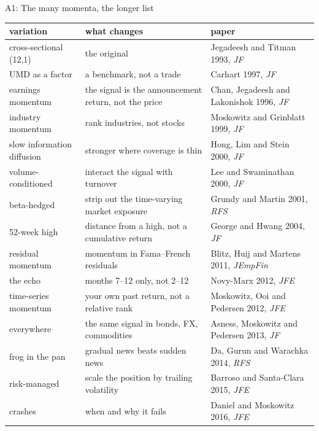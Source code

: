 \documentclass[aspectratio=169,10pt]{beamer}
\begin{document}
\begin{frame}[label=appendix_many]{A1: The many momenta, the longer list}
\scriptsize
\renewcommand{\arraystretch}{1.05}
\begin{center}
\begin{tabular}{P{2.8cm}P{4.8cm}P{4.9cm}}
\toprule
variation & what changes & paper \\
\midrule
cross-sectional (12,1) & the original & Jegadeesh and Titman 1993, \emph{JF} \\
UMD as a factor & a benchmark, not a trade & Carhart 1997, \emph{JF} \\
earnings momentum & the signal is the announcement return, not the price & Chan, Jegadeesh and Lakonishok 1996, \emph{JF} \\
industry momentum & rank industries, not stocks & Moskowitz and Grinblatt 1999, \emph{JF} \\
slow information diffusion & stronger where coverage is thin & Hong, Lim and Stein 2000, \emph{JF} \\
volume-conditioned & interact the signal with turnover & Lee and Swaminathan 2000, \emph{JF} \\
beta-hedged & strip out the time-varying market exposure & Grundy and Martin 2001, \emph{RFS} \\
52-week high & distance from a high, not a cumulative return & George and Hwang 2004, \emph{JF} \\
residual momentum & momentum in Fama--French residuals & Blitz, Huij and Martens 2011, \emph{JEmpFin} \\
the echo & months 7--12 only, not 2--12 & Novy-Marx 2012, \emph{JFE} \\
time-series momentum & your own past return, not a relative rank & Moskowitz, Ooi and Pedersen 2012, \emph{JFE} \\
everywhere & the same signal in bonds, FX, commodities & Asness, Moskowitz and Pedersen 2013, \emph{JF} \\
frog in the pan & gradual news beats sudden news & Da, Gurun and Warachka 2014, \emph{RFS} \\
risk-managed & scale the position by trailing volatility & Barroso and Santa-Clara 2015, \emph{JFE} \\
crashes & when and why it fails & Daniel and Moskowitz 2016, \emph{JFE} \\
\bottomrule
\end{tabular}
\end{center}
\hfill \hyperlink{many}{}
\end{frame}
\end{document}
